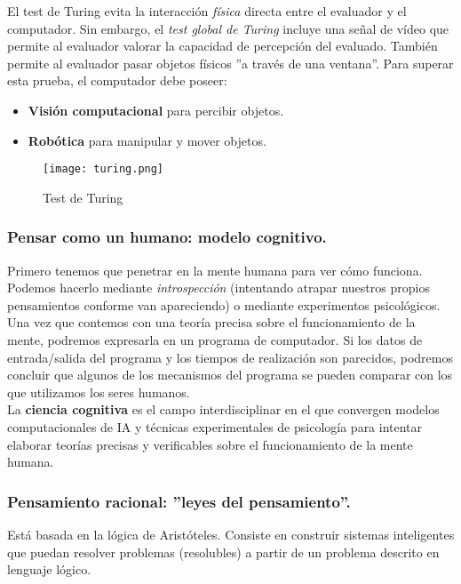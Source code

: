 \documentclass[12pt,spanish]{article}
\numberwithin{definition}{subsection}
\begin{document}
El test de Turing evita la interacción \emph{física} directa entre el evaluador y el computador. Sin embargo, el \emph{test global de Turing} incluye una señal de vídeo que permite al evaluador valorar la capacidad de percepción del evaluado. También permite al evaluador pasar objetos físicos ''a través de una ventana''. Para superar esta prueba, el computador debe poseer:
\begin{itemize}
	\item \textbf{Visión computacional} para percibir objetos.
	\item \textbf{Robótica} para manipular y mover objetos.
\end{itemize}

\begin{figure}[H]
\centering
\texttt{[image: turing.png]}
\caption{Test de Turing}
\end{figure}
\subsubsection{Pensar como un humano: modelo cognitivo.}
Primero tenemos que penetrar en la mente humana para ver cómo funciona. Podemos hacerlo mediante \emph{introspección} (intentando atrapar nuestros propios pensamientos conforme van apareciendo) o mediante experimentos psicológicos. Una vez que contemos con una teoría precisa sobre el funcionamiento de la mente, podremos expresarla en un programa de computador. Si los datos de entrada/salida del programa y los tiempos de realización son parecidos, podremos concluir que algunos de los mecanismos del programa se pueden comparar con los que utilizamos los seres humanos.\\

La \textbf{ciencia cognitiva} es el campo interdisciplinar en el que convergen modelos computacionales de IA y técnicas experimentales de psicología para intentar elaborar teorías precisas y verificables sobre el funcionamiento de la mente humana.

\subsubsection{Pensamiento racional: ''leyes del pensamiento''.}

Está basada en la lógica de Aristóteles. Consiste en construir sistemas inteligentes que puedan resolver problemas (resolubles) a partir de un problema descrito en lenguaje lógico. \\
\end{document}
